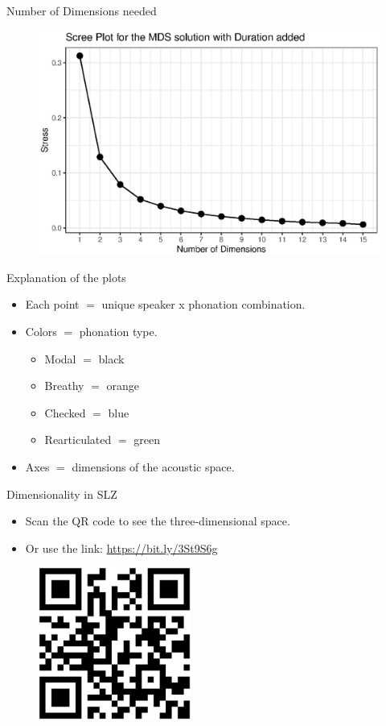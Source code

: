 \documentclass[professionalfonts]{beamer}
\begin{document}
\begin{frame}{Number of Dimensions needed}
  \begin{figure}
    \centering
    \includegraphics[width = 0.8\linewidth]{images/MDS/stress_plot_dur.eps}
\end{figure}
\end{frame}

\begin{frame}{Explanation of the plots}
  \begin{itemize}
    \item Each point $=$ unique speaker x phonation combination.
    \item Colors $=$ phonation type.
    \begin{itemize}
      \item Modal $=$ black
      \item Breathy $=$ orange
      \item Checked $=$ blue
      \item Rearticulated $=$ green
    \end{itemize}
    \item Axes $=$ dimensions of the acoustic space.
  \end{itemize}
\end{frame}

\begin{frame}{Dimensionality in SLZ}
  \begin{itemize}
    \item Scan the QR code to see the three-dimensional space.
    \item Or use the link: \href{https://bit.ly/3St9S6g}{https://bit.ly/3St9S6g}
  \end{itemize}
  \begin{figure}
    \centering
    \includegraphics[width=5cm, scale=0.5]{qrcode_3d_plot.eps}
  \end{figure}
\end{frame}
\end{document}
